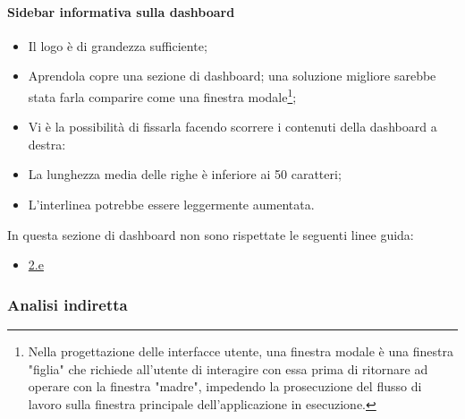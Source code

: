 \paragraph{Sidebar informativa sulla dashboard}
\begin{itemize}
    \item Il logo è di grandezza sufficiente;
    \item Aprendola copre una sezione di dashboard; una soluzione migliore sarebbe stata farla comparire come una finestra modale\footnote{Nella progettazione delle interfacce utente, una finestra modale è una finestra "figlia" che richiede all'utente di interagire con essa prima di ritornare ad operare con la finestra "madre", impedendo la prosecuzione del flusso di lavoro sulla finestra principale dell'applicazione in esecuzione.};
    \item Vi è la possibilità di fissarla facendo scorrere i contenuti della dashboard a destra:
    \item La lunghezza media delle righe è inferiore ai 50 caratteri;
    \item L'interlinea potrebbe essere leggermente aumentata.
\end{itemize}
In questa sezione di dashboard non sono rispettate le seguenti linee guida:
\begin{itemize}
    \item \hyperref[lg:2.e]{2.e}
\end{itemize}

\subsubsection{Analisi indiretta}

